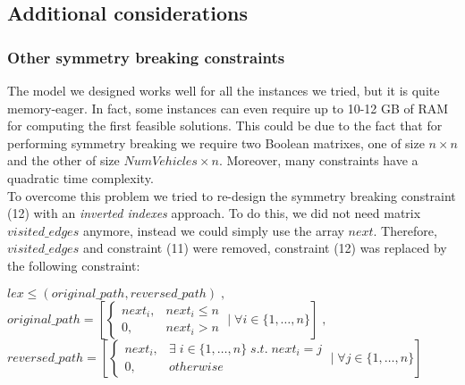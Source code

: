 \documentclass[../main.tex]{subfiles}
\begin{document}
\subsection{Additional considerations}
\label{subsec:additional-considerations}

\subsubsection{Other symmetry breaking constraints}
\label{subsubsec:other-symmetry-breaking-constraints}
The model we designed works well for all the instances we tried, but it is quite memory-eager. In fact, some instances can even require up to 10-12 GB of RAM for computing the first feasible solutions.
This could be due to the fact that for performing symmetry breaking we require two Boolean matrixes, one of size $n\times{}n$ and the other of size $NumVehicles\times{}n$. Moreover, many constraints have a quadratic time complexity.\\
To overcome this problem we tried to re-design the symmetry breaking constraint (12) with an \textit{inverted indexes} approach. To do this, we did not need matrix $visited\_edges$ anymore, instead we could simply use the array $next$.
Therefore, $visited\_edges$ and constraint (11) were removed, constraint (12) was replaced by the following constraint:
\begin{center}
    \begin{math}
        lex\leq(original\_path, reversed\_path) \; ,
    \end{math}\\
    \begin{math}
        original\_path = [
            \begin{cases}
                next_i, & next_i \leq n\\
                0, & next_i > n
            \end{cases} \; | \; \forall{} i \in \{1,\dots,n\}
        ] \; ,
    \end{math}\\
    \begin{math}
        reversed\_path = [
            \begin{cases}
                next_i, & \exists \; i \in \{1,\dots,n\} \; s.t. \; next_i = j\\
                0, & otherwise
            \end{cases} \; | \; \forall{} j \in \{1,\dots,n\}
        ]
    \end{math}
\end{center}
\end{document}
